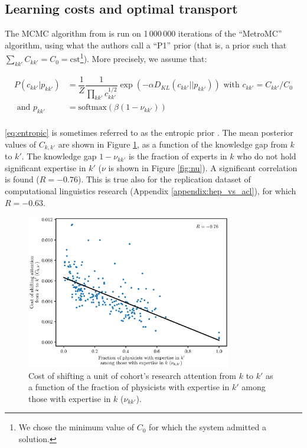 \documentclass{article}
\begin{document}


\subsection{\label{appendix:optimal_transport}Learning costs and optimal transport}

The MCMC algorithm from \citealt{pmlr-v162-chiu22b} is run on 1\,000\,000 iterations of the ``MetroMC'' algorithm, using what the authors call a ``P1'' prior (that is, a prior such that $\sum_{kk'}C_{kk'}=C_0=\mathrm{cst}$\footnote{We chose the minimum value of $C_0$ for which the system admitted a solution.}). More precisely, we assume that:

\begin{align}
    P(c_{kk'}|p_{kk'}) &= \dfrac{1}{Z}\dfrac{1}{\displaystyle\prod_{kk'} c_{kk'}^{1/2}} \exp{\left(-\alpha D_{KL}(c_{kk'}||p_{kk'})\right)} \text{ with } c_{kk'} = C_{kk'}/C_0\label{eq:entropic}\\
    \text{ and } p_{kk'} &= \mathrm{softmax}(\beta (1-\nu_{kk'}))\\
\end{align}

\eqref{eq:entropic} is sometimes referred to as the entropic prior \citep{skilling1991bayesian,MacKay1995}. The mean posterior values of $C_{k,k'}$ are shown in Figure \ref{fig:cost_knowledge}, as a function of the knowledge gap from $k$ to $k'$. The knowledge gap  $1-\nu_{kk'}$ is the fraction of experts in $k$ who do not hold significant expertise in $k'$ ($\nu$ is shown in Figure \ref{fig:nu}).  A significant correlation is found ($R=-0.76$). This is true also for the replication dataset of computational linguistics research (Appendix \ref{appendix:hep_vs_acl}), for which $R=-0.63$.

\begin{figure}[H]
    \centering
    \includegraphics[width=0.8\textwidth]{Fig16}
    \caption{Cost of shifting a unit of cohort's research attention from $k$ to $k'$ as a function of the fraction of physicists with expertise in $k'$ among those with expertise in $k$ ($\nu_{kk'}$).}
    \label{fig:cost_knowledge}
\end{figure}
\end{document}
